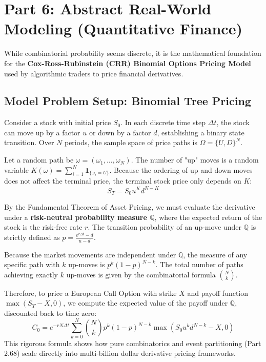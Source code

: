 \documentclass[11pt]{article}
\theoremstyle{definition}
\begin{document}
\section{Part 6: Abstract Real-World Modeling (Quantitative Finance)}

While combinatorial probability seems discrete, it is the mathematical foundation for the \textbf{Cox-Ross-Rubinstein (CRR) Binomial Options Pricing Model} used by algorithmic traders to price financial derivatives.

\subsection{Model Problem Setup: Binomial Tree Pricing}
Consider a stock with initial price $S_0$. In each discrete time step $\Delta t$, the stock can move up by a factor $u$ or down by a factor $d$, establishing a binary state transition. Over $N$ periods, the sample space of price paths is $\Omega = \{U, D\}^N$.

Let a random path be $\omega = (\omega_1, \dots, \omega_N)$. The number of "up" moves is a random variable $K(\omega) = \sum_{i=1}^N \mathbf{1}_{\{\omega_i = U\}}$. Because the ordering of up and down moves does not affect the terminal price, the terminal stock price only depends on $K$:
\[ S_T = S_0 u^K d^{N-K} \]

By the Fundamental Theorem of Asset Pricing, we must evaluate the derivative under a \textbf{risk-neutral probability measure $\mathbb{Q}$}, where the expected return of the stock is the risk-free rate $r$. The transition probability of an up-move under $\mathbb{Q}$ is strictly defined as $p = \frac{e^{r\Delta t} - d}{u - d}$.

Because the market movements are independent under $\mathbb{Q}$, the measure of any specific path with $k$ up-moves is $p^k (1-p)^{N-k}$. The total number of paths achieving exactly $k$ up-moves is given by the combinatorial formula $\binom{N}{k}$. 

Therefore, to price a European Call Option with strike $X$ and payoff function $\max(S_T - X, 0)$, we compute the expected value of the payoff under $\mathbb{Q}$, discounted back to time zero:
\[ C_0 = e^{-r N \Delta t} \sum_{k=0}^N \binom{N}{k} p^k (1-p)^{N-k} \max(S_0 u^k d^{N-k} - X, 0) \]
This rigorous formula shows how pure combinatorics and event partitioning (Part 2.68) scale directly into multi-billion dollar derivative pricing frameworks.
\end{document}

